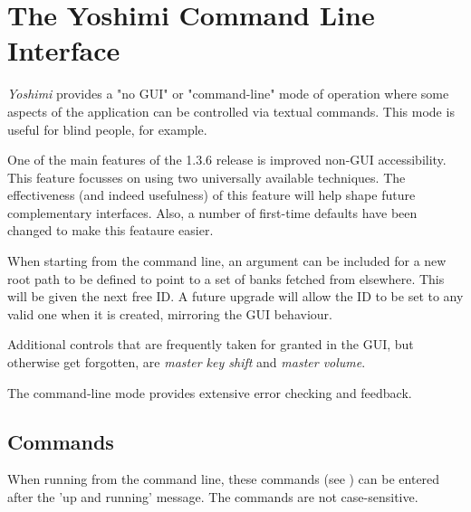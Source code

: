 %
%
%

\section{The Yoshimi Command Line Interface}
\label{sec:command_line}

   \textsl{Yoshimi} provides a "no GUI" or "command-line" mode of operation
   where some aspects of the application can be controlled via textual commands.
   This mode is useful for blind people, for example.

   One of the main features of the 1.3.6 release is improved non-GUI
   accessibility.  This feature focusses on using two universally available
   techniques. The effectiveness (and indeed usefulness) of this feature
   will help shape future complementary interfaces. Also, a number of
   first-time defaults have been changed to make this feataure easier.

   When starting from the command line, an argument can be included for a new
   root path to be defined to point to a set of banks fetched from elsewhere.
   This will be given the next free ID. A future upgrade will allow the ID to
   be set to any valid one when it is created, mirroring the GUI behaviour.

   Additional controls that are frequently taken for granted in the GUI, but
   otherwise get forgotten, are \textsl{master key shift}
   and \textsl{master volume}.

   The command-line mode provides extensive error checking and feedback.

\subsection{Commands}
\label{subsec:command_line_commands}

   When running from the command line, these commands
   (see )
   can be entered after the 'up and running' message.
   The commands are not case-sensitive.


